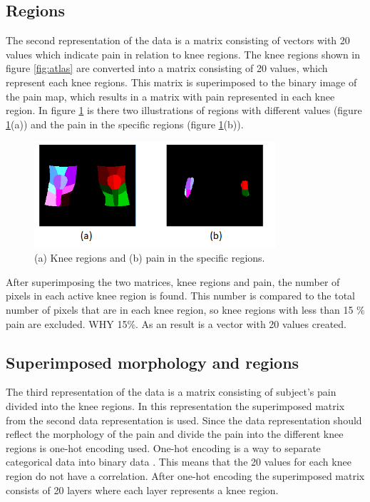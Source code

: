 \subsection{Regions}
The second representation of the data is a matrix consisting of vectors with 20 values which indicate pain in relation to knee regions. 
The knee regions shown in figure \ref{fig:atlas} are converted into a matrix consisting of 20 values, which represent each knee regions. This matrix is superimposed to the binary image of the pain map, which results in a matrix with pain represented in each knee region. In figure \ref{fig:binregions} is there two illustrations of regions with different values (figure \ref{fig:binregions}(a)) and the pain in the specific regions (figure \ref{fig:binregions}(b)).

\begin{figure} [H]
\centering
\includegraphics[width=0.8\textwidth]{figures/binregions}
\caption{(a) Knee regions and (b) pain in the specific regions.}
\label{fig:binregions}
\end{figure}

\noindent
After superimposing the two matrices, knee regions and pain, the number of pixels in each active knee region is found. This number is compared to the total number of pixels that are in each knee region, so knee regions with less than 15 \% pain are excluded. WHY 15\%. As an result is a vector with 20 values created.


\subsection{Superimposed morphology and regions}
The third representation of the data is a matrix consisting of subject's pain divided into the knee regions.
\noindent
In this representation the superimposed matrix from the second data representation is used. Since the data representation should reflect the morphology of the pain and divide the pain into the different knee regions is one-hot encoding used. One-hot encoding is a way to separate categorical data into binary data \citep{Harris2012}. This means that the 20 values for each knee region do not have a correlation. After one-hot encoding the superimposed matrix consists of 20 layers where each layer represents a knee region.

